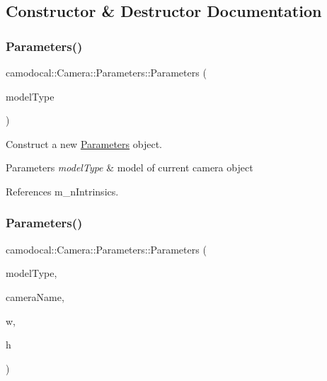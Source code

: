 \subsection{Constructor \& Destructor Documentation}
\mbox{\label{classcamodocal_1_1Camera_1_1Parameters_ab772f3921cda90a7860596b7495eb83c}} 
\subsubsection{\texorpdfstring{Parameters()}{Parameters()}\hspace{0.1cm}{\footnotesize\ttfamily [1/2]}}
{\footnotesize\ttfamily camodocal\+::\+Camera\+::\+Parameters\+::\+Parameters (\begin{DoxyParamCaption}\item[{\hyperlink{classcamodocal_1_1Camera_a663bb19b7b1f38f6d1b7eeb0890183ff}{Model\+Type}}]{model\+Type }\end{DoxyParamCaption})}



Construct a new \hyperlink{classcamodocal_1_1Camera_1_1Parameters}{Parameters} object. 


\begin{DoxyParams}{Parameters}
{\em model\+Type} & model of current camera object \\
\hline
\end{DoxyParams}


References m\+\_\+n\+Intrinsics.

\mbox{\label{classcamodocal_1_1Camera_1_1Parameters_ab729d4ad394ff16d115c6ce78ab77a95}} 
\subsubsection{\texorpdfstring{Parameters()}{Parameters()}\hspace{0.1cm}{\footnotesize\ttfamily [2/2]}}
{\footnotesize\ttfamily camodocal\+::\+Camera\+::\+Parameters\+::\+Parameters (\begin{DoxyParamCaption}\item[{\hyperlink{classcamodocal_1_1Camera_a663bb19b7b1f38f6d1b7eeb0890183ff}{Model\+Type}}]{model\+Type,  }\item[{const std\+::string \&}]{camera\+Name,  }\item[{int}]{w,  }\item[{int}]{h }\end{DoxyParamCaption})}



